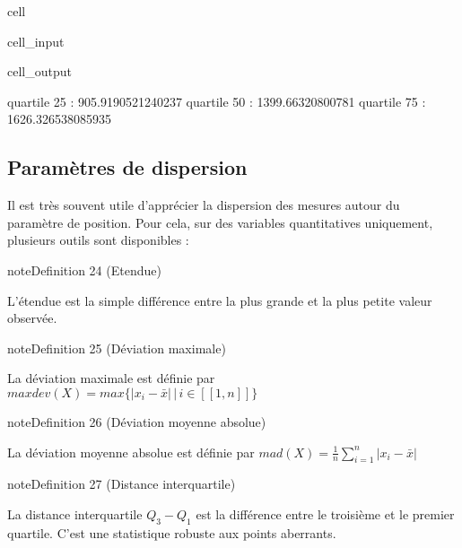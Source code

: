 \documentclass[letterpaper,10pt,french]{sphinxmanual}
\begin{document}
\begin{sphinxuseclass}{cell}
\begin{sphinxuseclass}{cell_input}
\end{sphinxuseclass}
\begin{sphinxuseclass}{cell_output}
\begin{sphinxVerbatim}[commandchars=\\\{\}]
quartile  25  :  905.9190521240237
quartile  50  :  1399.66320800781
quartile  75  :  1626.326538085935
\end{sphinxVerbatim}

\noindent{}

\end{sphinxuseclass}
\end{sphinxuseclass}

\subsection{Paramètres de dispersion}
\label{\detokenize{statsdescriptives:parametres-de-dispersion}}
\sphinxAtStartPar
Il est très souvent utile d’apprécier la dispersion des mesures autour du paramètre de position. Pour cela, sur des variables quantitatives uniquement, plusieurs outils sont disponibles :
\label{statsdescriptives:definition-8}
\begin{sphinxadmonition}{note}{Definition 24 (Etendue)}



\sphinxAtStartPar
L’étendue est la simple différence entre la plus grande et la plus petite valeur observée.
\end{sphinxadmonition}
\label{statsdescriptives:definition-9}
\begin{sphinxadmonition}{note}{Definition 25 (Déviation maximale)}



\sphinxAtStartPar
La déviation maximale est définie par
\( maxdev(X) = max \{ |x_i - \bar{x}| \,|\, i\in[\![1,n]\!]\}\)
\end{sphinxadmonition}
\label{statsdescriptives:definition-10}
\begin{sphinxadmonition}{note}{Definition 26 (Déviation moyenne absolue)}



\sphinxAtStartPar
La déviation moyenne absolue est définie par
\( mad(X) = \frac{1}{n} \displaystyle\sum_{i=1}^n |x_i - \bar{x}|\)
\end{sphinxadmonition}
\label{statsdescriptives:definition-11}
\begin{sphinxadmonition}{note}{Definition 27 (Distance interquartile)}



\sphinxAtStartPar
La distance interquartile \(Q_3-Q_1\) est la différence entre le troisième et le premier quartile. C’est une statistique robuste aux points aberrants.
\end{sphinxadmonition}
\end{document}
